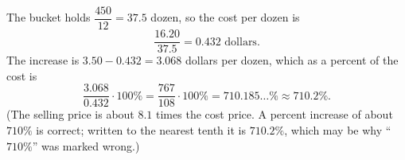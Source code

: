 The bucket holds $\dfrac{450}{12}=37.5$ dozen, so the cost per dozen is
\[
\dfrac{16.20}{37.5}=0.432\text{ dollars}.
\]
The increase is $3.50-0.432=3.068$ dollars per dozen, which as a percent of the cost is
\[
\dfrac{3.068}{0.432}\cdot100\%=\dfrac{767}{108}\cdot100\%=710.185\ldots\%\approx\boxed{710.2\%}.
\]
(The selling price is about $8.1$ times the cost price. A percent increase of about $710\%$ is correct; written to the nearest tenth it is $710.2\%$, which may be why ``$710\%$'' was marked wrong.)
